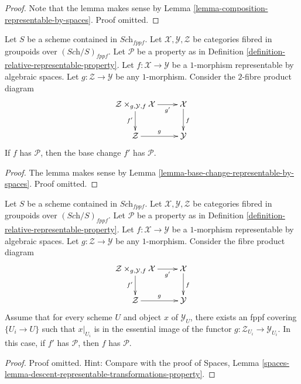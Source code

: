 \begin{proof}
Note that the lemma makes sense by
Lemma \ref{lemma-composition-representable-by-spaces}.
Proof omitted.
\end{proof}

\begin{lemma}
\label{lemma-base-change-representable-transformations-property}
Let $S$ be a scheme contained in $\textit{Sch}_{fppf}$.
Let $\mathcal{X}, \mathcal{Y}, \mathcal{Z}$
be categories fibred in groupoids over $(\textit{Sch}/S)_{fppf}$.
Let $\mathcal{P}$ be a property as in
Definition \ref{definition-relative-representable-property}.
Let $f : \mathcal{X} \to \mathcal{Y}$ be a $1$-morphism
representable by algebraic spaces.
Let $g : \mathcal{Z} \to \mathcal{Y}$ be any $1$-morphism.
Consider the $2$-fibre product diagram
$$
\xymatrix{
\mathcal{Z} \times_{g, \mathcal{Y}, f} \mathcal{X} \ar[r]_-{g'} \ar[d]_{f'} &
\mathcal{X} \ar[d]^f \\
\mathcal{Z} \ar[r]^g & \mathcal{Y}
}
$$
If $f$ has $\mathcal{P}$, then the base change $f'$
has $\mathcal{P}$.
\end{lemma}

\begin{proof}
The lemma makes sense by
Lemma \ref{lemma-base-change-representable-by-spaces}.
Proof omitted.
\end{proof}

\begin{lemma}
\label{lemma-descent-representable-transformations-property}
Let $S$ be a scheme contained in $\textit{Sch}_{fppf}$.
Let $\mathcal{X}, \mathcal{Y}, \mathcal{Z}$
be categories fibred in groupoids over $(\textit{Sch}/S)_{fppf}$.
Let $\mathcal{P}$ be a property as in
Definition \ref{definition-relative-representable-property}.
Let $f : \mathcal{X} \to \mathcal{Y}$ be a $1$-morphism
representable by algebraic spaces.
Let $g : \mathcal{Z} \to \mathcal{Y}$ be any $1$-morphism.
Consider the fibre product diagram
$$
\xymatrix{
\mathcal{Z} \times_{g, \mathcal{Y}, f} \mathcal{X} \ar[r]_-{g'} \ar[d]_{f'} &
\mathcal{X} \ar[d]^f \\
\mathcal{Z} \ar[r]^g & \mathcal{Y}
}
$$
Assume that for every scheme $U$ and object $x$ of $\mathcal{Y}_U$,
there exists an fppf covering $\{U_i \to U\}$ such that $x|_{U_i}$
is in the essential image of the functor
$g : \mathcal{Z}_{U_i} \to \mathcal{Y}_{U_i}$.
In this case, if $f'$ has $\mathcal{P}$, then $f$ has $\mathcal{P}$.
\end{lemma}

\begin{proof}
Proof omitted. Hint: Compare with the proof of
Spaces,
Lemma \ref{spaces-lemma-descent-representable-transformations-property}.
\end{proof}

